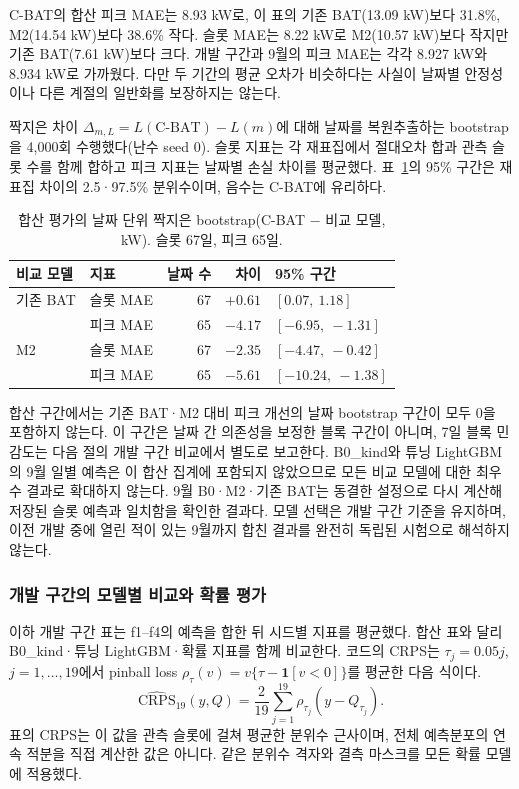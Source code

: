 C-BAT의 합산 피크 MAE는 8.93 kW로, 이 표의 기존 BAT(13.09 kW)보다 31.8\%, M2(14.54 kW)보다 38.6\% 작다. 슬롯 MAE는 8.22 kW로 M2(10.57 kW)보다 작지만 기존 BAT(7.61 kW)보다 크다. 개발 구간과 9월의 피크 MAE는 각각 8.927 kW와 8.934 kW로 가까웠다. 다만 두 기간의 평균 오차가 비슷하다는 사실이 날짜별 안정성이나 다른 계절의 일반화를 보장하지는 않는다.

짝지은 차이 $\Delta_{m,L}=L(\mathrm{C\text{-}BAT})-L(m)$에 대해 날짜를 복원추출하는 bootstrap을 4,000회 수행했다(난수 seed 0). 슬롯 지표는 각 재표집에서 절대오차 합과 관측 슬롯 수를 함께 합하고 피크 지표는 날짜별 손실 차이를 평균했다. 표~\ref{tab:ch4-pooled-boot}의 95\% 구간은 재표집 차이의 2.5·97.5\% 분위수이며, 음수는 C-BAT에 유리하다.

\begin{table}[htbp]
\centering
\caption{합산 평가의 날짜 단위 짝지은 bootstrap(C-BAT $-$ 비교 모델, kW). 슬롯 67일, 피크 65일.}
\label{tab:ch4-pooled-boot}
\small
\begin{tabular}{llrrl}
\toprule
비교 모델 & 지표 & 날짜 수 & 차이 & 95\% 구간 \\
\midrule
기존 BAT & 슬롯 MAE & 67 & $+0.61$ & $[0.07,\ 1.18]$ \\
 & 피크 MAE & 65 & $-4.17$ & $[-6.95,\ -1.31]$ \\
M2 & 슬롯 MAE & 67 & $-2.35$ & $[-4.47,\ -0.42]$ \\
 & 피크 MAE & 65 & $-5.61$ & $[-10.24,\ -1.38]$ \\
\bottomrule
\end{tabular}
\end{table}

합산 구간에서는 기존 BAT·M2 대비 피크 개선의 날짜 bootstrap 구간이 모두 0을 포함하지 않는다. 이 구간은 날짜 간 의존성을 보정한 블록 구간이 아니며, 7일 블록 민감도는 다음 절의 개발 구간 비교에서 별도로 보고한다. B0\_kind와 튜닝 LightGBM의 9월 일별 예측은 이 합산 집계에 포함되지 않았으므로 모든 비교 모델에 대한 최우수 결과로 확대하지 않는다. 9월 B0·M2·기존 BAT는 동결한 설정으로 다시 계산해 저장된 슬롯 예측과 일치함을 확인한 결과다. 모델 선택은 개발 구간 기준을 유지하며, 이전 개발 중에 열린 적이 있는 9월까지 합친 결과를 완전히 독립된 시험으로 해석하지 않는다.

\subsubsection{개발 구간의 모델별 비교와 확률 평가}

이하 개발 구간 표는 f1--f4의 예측을 합한 뒤 시드별 지표를 평균했다. 합산 표와 달리 B0\_kind·튜닝 LightGBM·확률 지표를 함께 비교한다. 코드의 CRPS는 $\tau_j=0.05j$, $j=1,\ldots,19$에서 pinball loss $\rho_\tau(v)=v\{\tau-\mathbf1[v<0]\}$를 평균한 다음 식이다.
\begin{equation}
\widehat{\mathrm{CRPS}}_{19}(y,Q)
=\frac2{19}\sum_{j=1}^{19}\rho_{\tau_j}(y-Q_{\tau_j}).
\label{eq:ch4-crps19}
\end{equation}
표의 CRPS는 이 값을 관측 슬롯에 걸쳐 평균한 분위수 근사이며, 전체 예측분포의 연속 적분을 직접 계산한 값은 아니다. 같은 분위수 격자와 결측 마스크를 모든 확률 모델에 적용했다.


